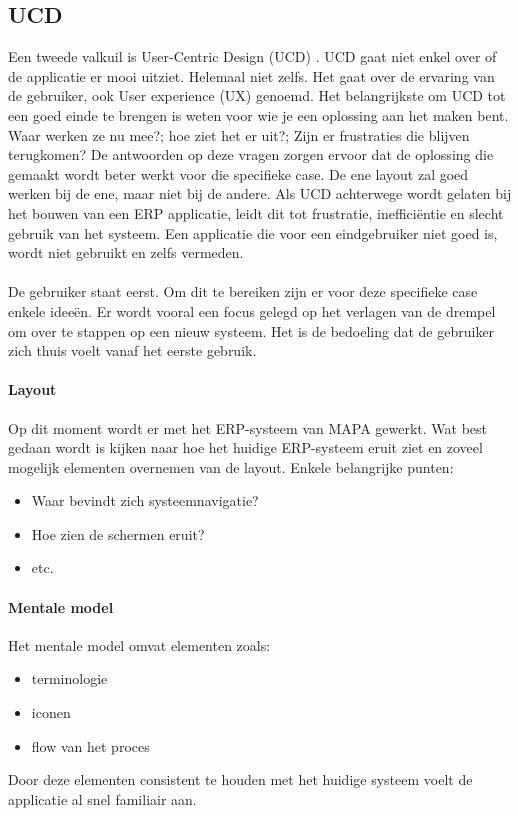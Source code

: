 \subsection{UCD}
\label{ucd}
Een tweede valkuil is User-Centric Design (UCD) \autocite{Rahman2025}. UCD gaat niet enkel over of de applicatie er mooi uitziet. Helemaal niet zelfs. Het gaat over de ervaring van de gebruiker, ook User experience (UX) genoemd. Het belangrijkste om UCD tot een goed einde te brengen is weten voor wie je een oplossing aan het maken bent. Waar werken ze nu mee?; hoe ziet het er uit?; Zijn er frustraties die blijven terugkomen? De antwoorden op deze vragen zorgen ervoor dat de oplossing die gemaakt wordt beter werkt voor die specifieke case. De ene layout zal goed werken bij de ene, maar niet bij de andere. Als UCD achterwege wordt gelaten bij het bouwen van een ERP applicatie, leidt dit tot frustratie, inefficiëntie en slecht gebruik van het systeem. Een applicatie die voor een eindgebruiker niet goed is, wordt niet gebruikt en zelfs vermeden.
\\
\\
De gebruiker staat eerst. Om dit te bereiken zijn er voor deze specifieke case enkele ideeën. Er wordt vooral een focus gelegd op het verlagen van de drempel om over te stappen op een nieuw systeem. Het is de bedoeling dat de gebruiker zich thuis voelt vanaf het eerste gebruik.
\paragraph{Layout}
Op dit moment wordt er met het ERP-systeem van MAPA gewerkt. Wat best gedaan wordt is kijken naar hoe het huidige ERP-systeem eruit ziet en zoveel mogelijk elementen overnemen van de layout. Enkele belangrijke punten:
\begin{itemize}
    \item Waar bevindt zich systeemnavigatie?
    \item Hoe zien de schermen eruit?
    \item etc.
\end{itemize}

\paragraph{Mentale model}
Het mentale model omvat elementen zoals:
\begin{itemize}
    \item terminologie
    \item iconen
    \item flow van het proces
\end{itemize}

Door deze elementen consistent te houden met het huidige systeem voelt de applicatie al snel familiair aan.

